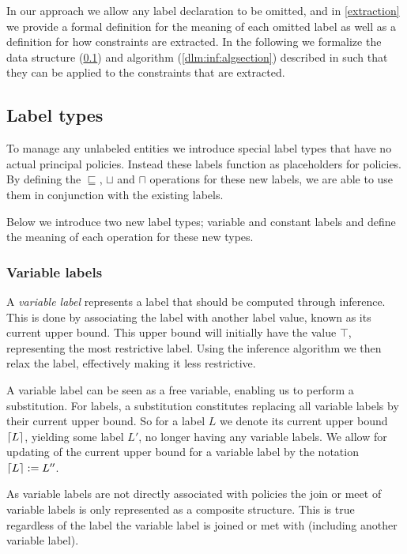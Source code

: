 In our approach we allow any label declaration to be omitted, and in \cref{extraction} we provide a formal definition for the meaning of each omitted label as well as a definition for how constraints are extracted.
In the following we formalize the data structure (\cref{dlm:inf:types}) and algorithm (\cref{dlm:inf:algsection}) described in \cite{myers1997} such that they can be applied to the constraints that are extracted.

\subsection{Label types}\label{dlm:inf:types}
To manage any unlabeled entities we introduce special label types that have no actual principal policies.
Instead these labels function as placeholders for policies.
By defining the $\sqsubseteq$, $\sqcup$ and $\sqcap$ operations for these new labels, we are able to use them in conjunction with the existing labels.

Below we introduce two new label types; variable and constant labels and define the meaning of each operation for these new types.

\subsubsection{Variable labels}
A \textit{variable label} represents a label that should be computed through inference.
This is done by associating the label with another label value, known as its current upper bound.
This upper bound will initially have the value $\top$, representing the most restrictive label.
Using the inference algorithm we then relax the label, effectively making it less restrictive.

A variable label can be seen as a free variable, enabling us to perform a substitution.
For labels, a substitution constitutes replacing all variable labels by their current upper bound.
So for a label $L$ we denote its current upper bound $\lceil L\rceil$, yielding some label $L'$, no longer having any variable labels.
We allow for updating of the current upper bound for a variable label by the notation $\lceil L\rceil := L''$.

As variable labels are not directly associated with policies the join or meet of variable labels is only represented as a composite structure.
This is true regardless of the label the variable label is joined or met with (including another variable label).

